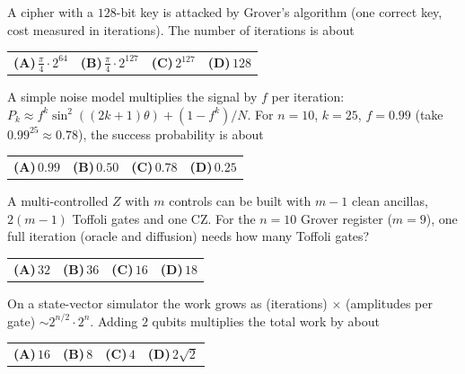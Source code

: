 \documentclass[11pt,a4paper]{article}
\newcommand{\optlabel}[1]{\textbf{(#1)}}
\newenvironment{qitem}[1]{\begin{list}{}{\setlength{\leftmargin}{3.3em}\setlength{\labelwidth}{3.1em}%
  \setlength{\labelsep}{0.2em}\setlength{\topsep}{3pt}\setlength{\parsep}{3pt}}\item[\textbf{Q.#1}\hfill]}{\end{list}}
\newcommand{\qsep}{\par\vspace{2pt}{\color{black!15}\hrule}\vspace{4pt}}
\begin{document}
\begin{qitem}{68}
A cipher with a $128$-bit key is attacked by Grover's algorithm (one correct key, cost measured in iterations). The number of iterations is about
\par\smallskip\noindent\begin{tabularx}{\linewidth}{@{}*{4}{L}@{}}
\optlabel{A}\,$\frac\pi4\cdot2^{64}$ & \optlabel{B}\,$\frac\pi4\cdot2^{127}$ & \optlabel{C}\,$2^{127}$ & \optlabel{D}\,$128$
\end{tabularx}
\end{qitem}
\qsep

\begin{qitem}{69}
A simple noise model multiplies the signal by $f$ per iteration: $P_k \approx f^{k}\sin^2((2k+1)\theta) + (1 - f^{k})/N$. For $n = 10$, $k = 25$, $f = 0.99$ (take $0.99^{25} \approx 0.78$), the success probability is about
\par\smallskip\noindent\begin{tabularx}{\linewidth}{@{}*{4}{L}@{}}
\optlabel{A}\,$0.99$ & \optlabel{B}\,$0.50$ & \optlabel{C}\,$0.78$ & \optlabel{D}\,$0.25$
\end{tabularx}
\end{qitem}
\qsep

\begin{qitem}{70}
A multi-controlled $Z$ with $m$ controls can be built with $m - 1$ clean ancillas, $2(m-1)$ Toffoli gates and one CZ. For the $n = 10$ Grover register ($m = 9$), one full iteration (oracle and diffusion) needs how many Toffoli gates?
\par\smallskip\noindent\begin{tabularx}{\linewidth}{@{}*{4}{L}@{}}
\optlabel{A}\,$32$ & \optlabel{B}\,$36$ & \optlabel{C}\,$16$ & \optlabel{D}\,$18$
\end{tabularx}
\end{qitem}
\qsep

\begin{qitem}{71}
On a state-vector simulator the work grows as (iterations) $\times$ (amplitudes per gate) $\sim 2^{n/2}\cdot2^{n}$. Adding $2$ qubits multiplies the total work by about
\par\smallskip\noindent\begin{tabularx}{\linewidth}{@{}*{4}{L}@{}}
\optlabel{A}\,$16$ & \optlabel{B}\,$8$ & \optlabel{C}\,$4$ & \optlabel{D}\,$2\sqrt2$
\end{tabularx}
\end{qitem}
\qsep
\end{document}
